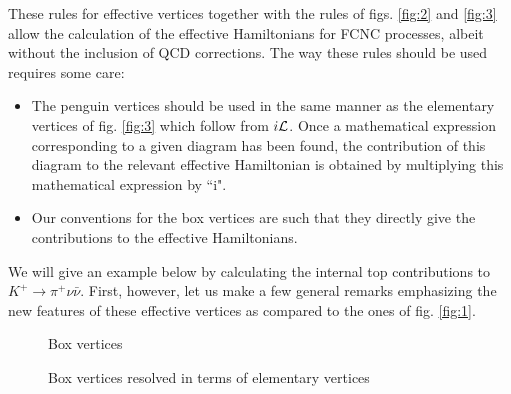 \documentclass[12pt]{article}
\newcommand{\bi}{\begin{itemize}}
\newcommand{\ei}{\end{itemize}}
\begin{document}
\begin{itemize}
These rules for effective vertices
together with the rules of figs. \ref{fig:2} and \ref{fig:3}  allow 
the calculation of
the effective Hamiltonians for FCNC processes, albeit without the inclusion
of QCD corrections. The way these rules should be used requires  some care:
\bi
\item
 The penguin vertices should be used in the same manner as the
elementary vertices of fig. \ref{fig:3} which follow from $i {\cal L}$. 
Once a
mathematical expression corresponding to a given diagram has been found,
the contribution of this diagram to the relevant effective Hamiltonian
is obtained by multiplying this mathematical expression by ``i". 
\item
Our conventions for the box vertices are such that they directly 
give the contributions to the effective Hamiltonians. 
\ei
We will give an
example below by calculating the internal top contributions to 
$K^+\to \pi^+\nu\bar\nu$.
First, however, let us make a few
general remarks emphasizing the new features of these effective
vertices as compared to the ones of fig. \ref{fig:1}.
\begin{figure}[hbt]
\centerline{
\epsfysize=1.6in
}
\caption[]{
Box vertices 
\label{fig:6}}
\end{figure}   

\begin{figure}[hbt]
\centerline{
\epsfysize=3.2in
}
\caption[]{
Box vertices resolved in terms of elementary vertices
\label{fig:7}}
\end{figure}


\end{itemize}
\end{document}
